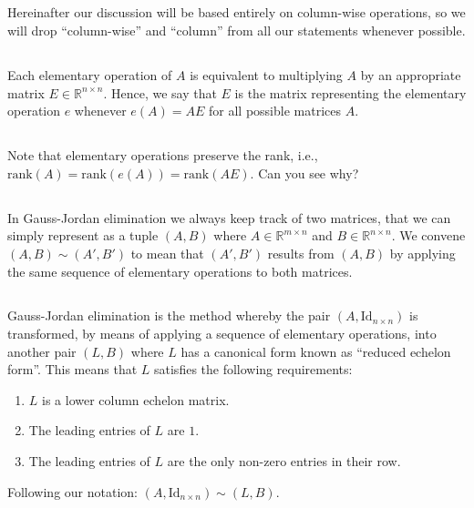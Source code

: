 \documentclass{proc-l}
\theoremstyle{definition}
\theoremstyle{remark}
\numberwithin{equation}{section}
\newcommand{\R}{\mathbb{R}}
\newcommand{\rank}[1]{\textrm{rank}({#1})}
\newcommand{\x}{\times}
\newcommand{\id}[1]{\textrm{Id}_{{#1}\times {#1}}}
\begin{document}
\subsection{}
Hereinafter our discussion will be based entirely on column-wise operations, so we will drop ``column-wise'' and ``column'' from all our statements whenever possible.

\subsection{}
Each elementary operation of $A$ is equivalent to multiplying $A$ by an appropriate matrix $E \in \R^{n\times n}$. Hence, we say that $E$ is the matrix representing the elementary operation $e$ whenever $e(A) = AE$ for all possible matrices $A$.

\subsection{}
Note that elementary operations preserve the rank, i.e., $\rank{A} = \rank{e(A)} = \rank{AE}$. Can you see why?

\subsection{}
In Gauss-Jordan elimination we always keep track of two matrices, that we can simply represent as a tuple $(A, B)$ where $A\in\R^{m\x n}$ and $B\in\R^{n\x n}$. We convene $(A, B) \sim (A', B')$ to mean that $(A', B')$ results from $(A, B)$ by applying the same sequence of elementary operations to both matrices.

\subsection{}
Gauss-Jordan elimination is the method whereby the pair $(A, \id{n})$ is transformed, by means of applying a sequence of elementary operations, into another pair $(L, B)$ where $L$ has a canonical form known as ``reduced echelon form''. This means that $L$ satisfies the following requirements:
\begin{enumerate}
\item $L$ is a lower column echelon matrix.
\item The leading entries of $L$ are $1$.
\item The leading entries of $L$ are the only non-zero entries in their row. 
\end{enumerate}
Following our notation: $(A, \id{n})\sim (L, B)$. 
\end{document}
